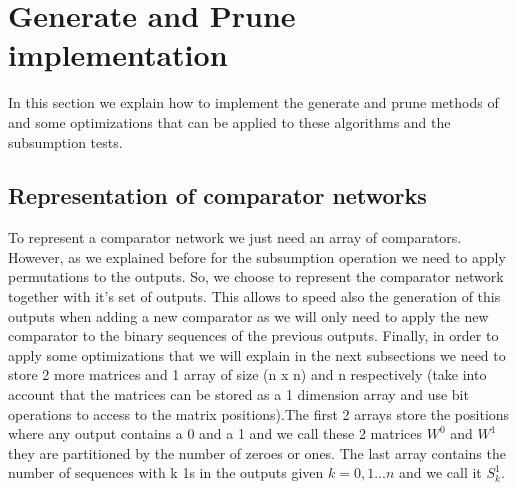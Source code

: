 \documentclass[../main.tex]{subfiles}
\begin{document}
	\section{Generate and Prune implementation}
	In this section we explain how to implement the generate and prune methods of \cite{sortingnineinputs} and some optimizations that can be applied to these algorithms and the subsumption tests. 
	
	\subsection{Representation of comparator networks}
	To represent a comparator network we just need an array of comparators. However, as we explained before for the subsumption operation we need to apply permutations to the outputs. So, we choose to represent the comparator network together with it's set of outputs. This allows to speed also the generation of this outputs when adding a new comparator as we will only need to apply the new comparator to the binary sequences of the previous outputs. Finally, in order to apply some optimizations that we will explain in the next subsections we need to store 2 more matrices and 1 array of size (n x n) and n respectively (take into account that the matrices can be stored as a 1 dimension array and use bit operations to access to the matrix positions).The first 2 arrays store the positions where any output contains a 0 and a 1 and we call  these 2 matrices $W^0$ and $W^1$ they are partitioned by the number of zeroes or ones. The last array contains the number of sequences with k 1s in the outputs given $k=0,1...n$ and we call it $S^{1}_k$.
	
\end{document}
